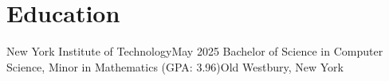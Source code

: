 \section{Education}
    \resumeSubHeadingListStart
    \resumeSubheading
    {New York Institute of Technology}{May 2025}
    {Bachelor of Science in Computer Science, Minor in Mathematics (GPA: 3.96)}{Old Westbury, New York}
    \resumeSubHeadingListEnd
